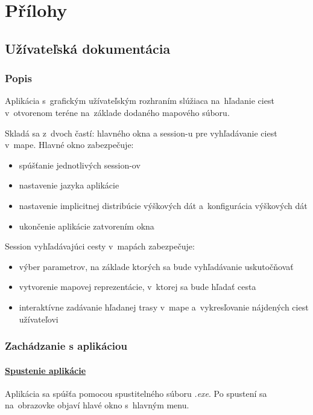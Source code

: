 \documentclass[12pt,a4paper]{report}
\begin{document}
\chapter{Přílohy}

\section{Užívateľská dokumentácia}\label{uzivatelska_dokumentacia}

\subsection{Popis}

Aplikácia s~grafickým užívateľským rozhraním slúžiaca na~hľadanie ciest v~otvorenom teréne na~základe dodaného mapového súboru.

Skladá sa z~dvoch častí: hlavného okna a session-u pre vyhľadávanie ciest v~mape. Hlavné okno zabezpečuje:
\begin{itemize}
    \item spúšťanie jednotlivých session-ov
    \item nastavenie jazyka aplikácie
    \item nastavenie implicitnej distribúcie výškových dát a~konfigurácia výškových dát
    \item ukončenie aplikácie zatvorením okna
\end{itemize}
Session vyhľadávajúci cesty v~mapách zabezpečuje:
\begin{itemize}
    \item výber parametrov, na základe ktorých sa bude vyhľadávanie uskutočňovať
    \item vytvorenie mapovej reprezentácie, v~ktorej sa bude hľadať cesta
    \item interaktívne zadávanie hľadanej trasy v~mape a~vykresľovanie nájdených ciest užívateľovi
\end{itemize}

\subsection{Zachádzanie s aplikáciou}

\subsubsection{\underline{Spustenie aplikácie}}

Aplikácia sa spúšťa pomocou spustitelného súboru \textit{.exe}. Po spustení sa na~obrazovke objaví hlavé okno s~hlavným menu.
\end{document}
